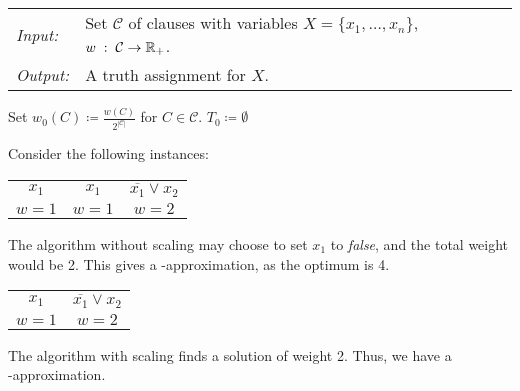 \documentclass[../skript.tex]{subfiles}
\begin{document}
\begin{algorithmbox}
\begin{tabular}{@{}ll}
\textit{Input:} & Set $\mathcal{C}$ of clauses with variables $X = \{ x_1, \ldots, x_n \}$, $w \; : \; \mathcal{C} \to \mathbb{R}_+$. \\
\textit{Output:} & A truth assignment for $X$.
\end{tabular}
\end{algorithmbox}
\vspace{-7pt}
\begin{algorithm}[H]
Set $w_0(C) \coloneqq \frac{w(C)}{2^{|\mathcal{C}|}}$ for $C \in \mathcal{C}$.\;
$T_0 \coloneqq \emptyset$\;
\end{algorithm}
\vspace{-7pt}
\EndAlgorithmLine
\begin{example}
Consider the following instances:
\begin{center}
\begin{tabular}{ccc}
$x_1$ & $x_1$ & $\overline{x_1} \vee x_2$ \\
$w = 1$ & $w=1$ & $w = 2$
\end{tabular}
\end{center}

The algorithm without scaling may choose to set $x_1$ to \textit{false}, and the total weight would be 2. This gives a -approximation, as the optimum is 4.
\begin{center}
\begin{tabular}{cc}
$x_1$ & $\overline{x_1} \vee x_2$ \\
$w = 1$ & $w = 2$
\end{tabular}
\end{center}

The algorithm with scaling finds a solution of weight 2. Thus, we have a \\ -approximation.
\end{example}
\end{document}
